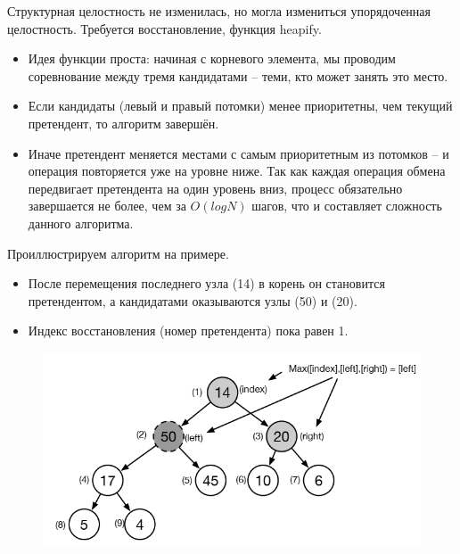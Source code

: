 \documentclass{beamer}
\begin{document}
\begin{frame}
	Структурная целостность не изменилась, но могла измениться упорядоченная целостность. Требуется восстановление, функция heapify.
	\begin{itemize}
		\item Идея функции проста: начиная с корневого элемента, мы проводим соревнование между тремя кандидатами -- теми, кто может занять это место.
		\item Если кандидаты (левый и правый потомки) менее приоритетны, чем текущий претендент, то алгоритм завершён. 
		\item Иначе претендент меняется местами с самым приоритетным из потомков -- и операция повторяется уже на
уровне ниже. Так как каждая операция обмена передвигает претендента на один уровень вниз, процесс обязательно завершается не более, чем за $O(log N)$ шагов, что и составляет сложность данного алгоритма.	
	\end{itemize}
\end{frame}

\begin{frame}	
	Проиллюстрируем алгоритм на примере. 
	\begin{itemize}
		\item После перемещения последнего узла (14) в корень он становится претендентом, а кандидатами оказываются узлы (50) и (20). 
		\item Индекс восстановления (номер претендента) пока равен 1.
	\end{itemize}
	\begin{figure}[h]
		\centering
		\includegraphics[scale=0.5]{images/lec06-pic16.png}
	\end{figure}	
\end{frame}
\end{document}
